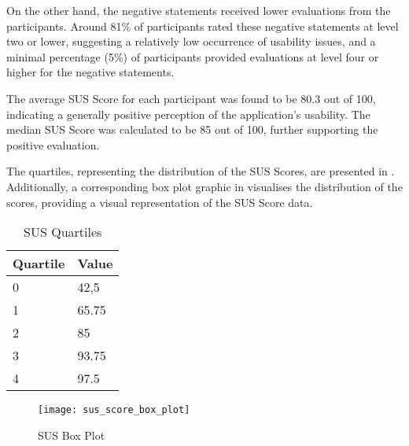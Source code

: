 On the other hand, the negative statements received lower evaluations from the
participants. Around 81\% of participants rated these negative statements at
level two or lower, suggesting a relatively low occurrence of usability issues,
and a minimal percentage (5\%) of participants provided evaluations at level
four or higher for the negative statements.

The average SUS Score for each participant was found to be 80.3 out of 100,
indicating a generally positive perception of the application's usability. The
median SUS Score was calculated to be 85 out of 100, further supporting the
positive evaluation.

The quartiles, representing the distribution of the SUS Scores, are presented
in . Additionally, a corresponding box plot graphic in
 visualises the distribution of the scores, providing a
visual representation of the SUS Score data.

\begin{table}[!htb] \caption{SUS Quartiles} \label{tab:sus_quartiles}
  \begin{center}
    \begin{tabular}[c]{p{8em}|p{8em}}
      \textbf{Quartile} &
      \textbf{Value} \\
      \hline 0 & 42,5 \\
      \hline 1 & 65.75 \\
      \hline 2 & 85 \\
      \hline 3 & 93.75 \\
      \hline 4 & 97.5 \\
    \end{tabular}
  \end{center}
\end{table}

\begin{figure*}[!htb]
  \caption{SUS Box Plot}
  \label{fig:sus_box_plot}
  \centering
  \texttt{[image: sus\_score\_box\_plot]}
\end{figure*}
